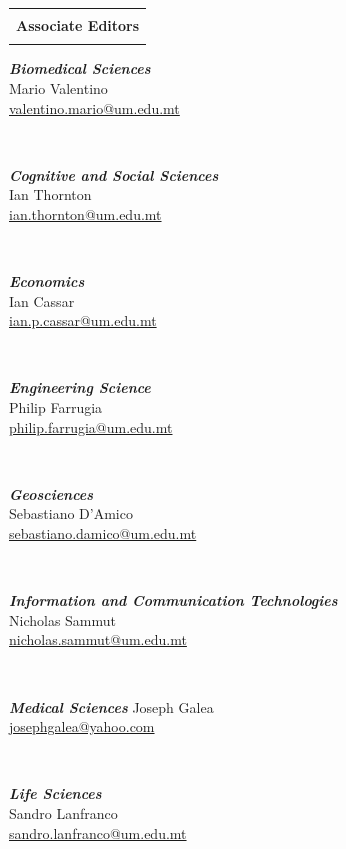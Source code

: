 {\begin{strip}
\begin{adjustwidth}{-2mm}{}
\begin{tabular*}{\textwidth}{l}

\hline
\\
\textbf{Associate Editors}\\
\\
\hline
\end{tabular*}
\end{adjustwidth}
\end{strip}

\vspace*{-0.7cm}
\begin{scriptsize}

\noindent\parbox{0.5\textwidth}{
\noindent\textbf{\textit{Biomedical Sciences}}\\
Mario Valentino\\
\href{mailto:valentino.mario@um.edu.mt}{valentino.mario@um.edu.mt}
}\\[2ex]
%
\parbox{0.5\textwidth}{
\noindent\textbf{\textit{Cognitive and Social Sciences}}\\
Ian Thornton\\
\href{mailto:ian.thornton@um.edu.mt}{ian.thornton@um.edu.mt}
}\\[2ex]
%
\parbox{0.5\textwidth}{
\noindent\textbf{\textit{Economics}}\\
Ian Cassar\\
\href{mailto:ian.p.cassar@um.edu.mt}{ian.p.cassar@um.edu.mt}
}\\[2ex]
%
\parbox{0.5\textwidth}{
\noindent\textbf{\textit{Engineering Science}}\\
Philip Farrugia\\
\href{mailto:philip.farrugia@um.edu.mt}{philip.farrugia@um.edu.mt}
}\\[2ex]
%
\parbox{0.5\textwidth}{
\noindent\textbf{\textit{Geosciences}}\\
Sebastiano D'Amico\\
\href{mailto:sebastiano.damico@um.edu.mt}{sebastiano.damico@um.edu.mt}
}\\[2ex]
%
\parbox{0.5\textwidth}{
\noindent\textbf{\textit{Information and Communication Technologies}}\\
Nicholas Sammut\\
\href{mailto:nicholas.sammut@um.edu.mt}{nicholas.sammut@um.edu.mt}
}\\[2ex]
%
\parbox{0.5\textwidth}{
\noindent\textbf{\textit{Medical Sciences}}\newline
Joseph Galea\\
\href{mailto:josephgalea@yahoo.com}{josephgalea@yahoo.com}
}\\[2ex]
%
\parbox{0.5\textwidth}{
\noindent\textbf{\textit{Life Sciences}}\\
Sandro Lanfranco\\
\href{mailto:sandro.lanfranco@um.edu.mt}{sandro.lanfranco@um.edu.mt}
}\\[1ex]


\end{scriptsize}}
